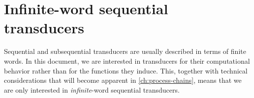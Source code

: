 


      


\section{Infinite-word sequential transducers}

Sequential and subsequential transducers\autocites{Ginsburg+Rose:CJM66}{Schuetzenberger:TCS77}  are usually described in terms of finite words.
In this document, we are interested in transducers for their computational behavior rather than for the functions they induce.
This, together with technical considerations that will become apparent in \cref{ch:process-chains}, means that we are only interested in \emph{infinite}-word sequential transducers.

